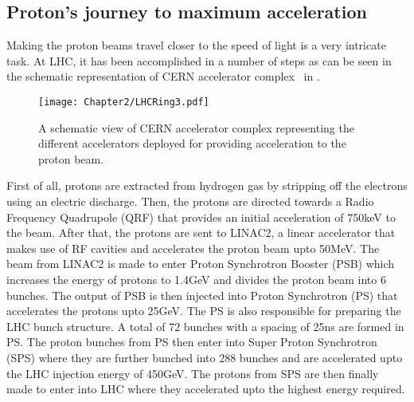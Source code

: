 \subsection{Proton's journey to maximum acceleration}
Making the proton beams travel closer to the speed of light is a very intricate task. At LHC, it has been accomplished
in a number of steps as can be seen in the schematic representation of CERN accelerator complex~\cite{Web:CERN} in \fig{\ref{fig:LHCring}}.
\begin{figure}[h]
\begin{center}
\texttt{[image: Chapter2/LHCRing3.pdf]}
\caption{A schematic view of CERN accelerator complex representing the different accelerators deployed for providing acceleration to the proton beam.}
\label{fig:LHCring}
\end{center}
\end{figure}
First of all, protons are extracted from hydrogen gas by stripping off the electrons using an electric discharge. Then, the protons
are directed towards a Radio Frequency Quadrupole (QRF) that provides an initial acceleration of 750\unit{keV} to the beam. After that, the protons are sent to
LINAC2, a linear accelerator that makes use of RF cavities and accelerates the proton beam upto 50\unit{MeV}. The beam from LINAC2 is made to enter
Proton Synchrotron Booster (PSB) which increases the energy of protons to 1.4\unit{GeV} and divides the proton beam into 6 bunches.
The output of PSB is then injected into Proton Synchrotron (PS) that accelerates the protons upto 25\unit{GeV}.
The PS is also responsible for preparing the LHC bunch structure. A total of 72 bunches with a spacing of 25\unit{ns} are formed in PS. The proton bunches from PS
then enter into Super Proton Synchrotron (SPS) where they are further bunched into 288 bunches and are accelerated upto the LHC injection energy of 450\unit{GeV}.
The protons from SPS are then finally made to enter into LHC where they accelerated upto the highest energy required.


